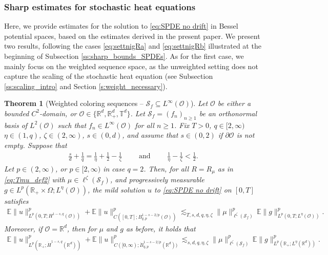 \documentclass[reqno]{amsart}
\theoremstyle{plain}
\newtheorem{theorem}{Theorem}[section]
\theoremstyle{remark}
\theoremstyle{plain}
\numberwithin{equation}{section}
\newcommand\cO{\mathcal{O}}
\def\R{{\mathbb R}}
\newcommand{\E}{{\mathbb E}}
\renewcommand{\O}{\Omega}
\newcommand{\T}{\mathbb{T}}
\newcommand{\1}{\one}
\newcommand{\Sf}{\mathcal{S}_{f}}
\begin{document}
\subsubsection{Sharp estimates for stochastic heat equations}
\label{ss:results_heat_eq_general}
Here, we provide estimates for the solution to \eqref{eq:SPDE no drift} in Bessel potential spaces, based on the estimates derived in the present paper. 
We present two results, following the cases \eqref{eq:settnigRa} and \eqref{eq:settnigRb} illustrated at the beginning of Subsection \ref{ss:sharp_bounds_SPDEs}. 
As for the first case, we mainly focus on the weighted sequence space, as the unweighted setting does not capture the scaling of the stochastic heat equation (see Subsection \ref{ss:scaling_intro} and Section \ref{s:weight_necessary}).

\begin{theorem}[Weighted coloring sequences -- $\Sf\subseteq  L^\infty(\cO)$]
\label{thm: spde with delta no time}
Let $\cO$ be either a bounded $C^2$-domain, or $\cO\in \{\R^d,\R^d_+,\T^d\}$.
Let $\Sf=(f_n)_{n\geq 1}$ be an orthonormal basis of $L^2(\cO)$ such that $f_n\in L^\infty(\cO)$ for all $n\geq 1$.
    Fix $T>0$, $q\in [2, \infty)$ $\eta\in (1, q)$, $\zeta\in (2, \infty)$,  $s\in(0,d)$, and assume that $s\in (0,2)$  if $\partial\cO$ is not empty.  Suppose that 
\begin{align}\label{eq:sharpsqetazeta}
\frac{s}{d} + \frac{1}{q}  = \frac{1}{\eta} + \frac{1}{2} - \frac{1}{\zeta} \qquad \text{ and } \qquad   \frac{1}{\eta} - \frac{1}{\zeta}<\frac12.
\end{align}
Let $p\in (2,\infty)$, or $p\in [2,\infty)$ in case $q=2$.
Then, for all $R=R_\mu$ as in \eqref{eq:Tmu_def2} with $\mu\in\ell^\zeta(\Sf)$, and progressively measurable $g\in L^p(\R_+\times \O;L^\eta(\cO))$, the mild solution $u$ to \eqref{eq:SPDE no drift} on $[0,T]$ satisfies
\begin{align}
  \E\|u\|_{L^p(0,T;H^{1-s,q}(\cO))}^p 
  + \E\|u\|_{C([0,T];B^{1-s-2/p}_{q,p}(\cO))}^p
    \lesssim_{T,s,d,q,\eta,\zeta}\|\mu\|_{\ell^\zeta(\Sf)}^p\,
   \E\|g\|_{L^{p}(0,T;L^\eta(\cO))}^p.
\end{align}
Moreover, if $\cO=\R^d$, then for $\mu$ and $g$ as before, it holds that  
\begin{align}
  \E\|u\|_{L^p(\R_+;\dot{H}^{1-s,q}(\R^d))}^p 
  + \E\|u\|_{C([0,\infty);\dot{B}^{1-s-2/p}_{q,p}(\R^d))}^p
    \lesssim_{s,d,q,\eta,\zeta}\|\mu\|_{\ell^\zeta(\Sf)}^p\,
   \E\|g\|_{L^{p}(\R_+;L^\eta(\R^d))}^p.
\end{align}
\end{theorem}
\end{document}
